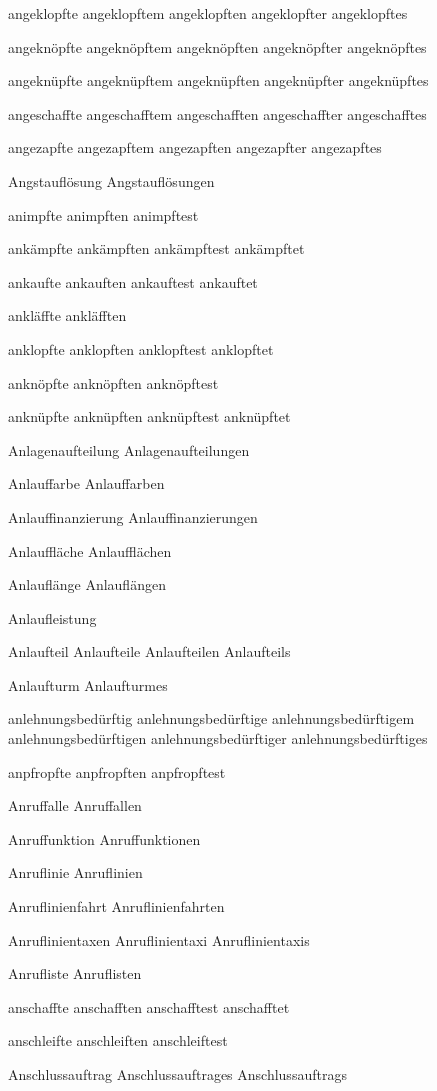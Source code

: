 angeklopfte
angeklopftem
angeklopften
angeklopfter
angeklopftes

angeknöpfte
angeknöpftem
angeknöpften
angeknöpfter
angeknöpftes

angeknüpfte
angeknüpftem
angeknüpften
angeknüpfter
angeknüpftes

angeschaffte
angeschafftem
angeschafften
angeschaffter
angeschafftes

angezapfte
angezapftem
angezapften
angezapfter
angezapftes

Angstauflösung
Angstauflösungen

animpfte
animpften
animpftest

ankämpfte
ankämpften
ankämpftest
ankämpftet

ankaufte
ankauften
ankauftest
ankauftet

ankläffte
ankläfften

anklopfte
anklopften
anklopftest
anklopftet

anknöpfte
anknöpften
anknöpftest

anknüpfte
anknüpften
anknüpftest
anknüpftet

Anlagenaufteilung
Anlagenaufteilungen

Anlauffarbe
Anlauffarben

Anlauffinanzierung
Anlauffinanzierungen

Anlauffläche
Anlaufflächen

Anlauflänge
Anlauflängen

Anlaufleistung

Anlaufteil
Anlaufteile
Anlaufteilen
Anlaufteils

Anlaufturm
Anlaufturmes

anlehnungsbedürftig
anlehnungsbedürftige
anlehnungsbedürftigem
anlehnungsbedürftigen
anlehnungsbedürftiger
anlehnungsbedürftiges

anpfropfte
anpfropften
anpfropftest

Anruffalle
Anruffallen

Anruffunktion
Anruffunktionen

Anruflinie
Anruflinien

Anruflinienfahrt
Anruflinienfahrten

Anruflinientaxen
Anruflinientaxi
Anruflinientaxis

Anrufliste
Anruflisten

anschaffte
anschafften
anschafftest
anschafftet

anschleifte
anschleiften
anschleiftest

Anschlussauftrag
Anschlussauftrages
Anschlussauftrags

